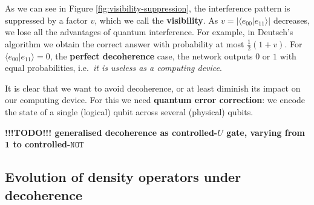 \documentclass[fleqn]{article}
\newenvironment{idea}{\noindent}{\medskip}
\begin{document}
As we can see in Figure \ref{fig:visibility-suppression}, the interference pattern is suppressed by a factor \(v\), which we call the \textbf{visibility}.
As \(v=|\langle e_{00}|e_{11}\rangle|\) decreases, we lose all the advantages of quantum interference.
For example, in Deutsch's algorithm we obtain the correct answer with probability at most \(\frac12(1+v)\).
For \(\langle e_{00}|e_{11}\rangle = 0\), the \textbf{perfect decoherence} case, the network outputs \(0\) or \(1\) with equal probabilities, i.e.~\emph{it is useless as a computing device}.

\begin{idea}

It is clear that we want to avoid decoherence, or at least diminish its impact on our computing device.
For this we need \textbf{quantum error correction}: we encode the state of a single (logical) qubit across several (physical) qubits.

\end{idea}

\textbf{!!!TODO!!! generalised decoherence as controlled-\(U\) gate, varying from \(\mathbf{1}\) to controlled-\(\texttt{NOT}\)}

\hypertarget{evolution-of-density-operators-under-decoherence}{%
\subsection{Evolution of density operators under decoherence}\label{evolution-of-density-operators-under-decoherence}}
\end{document}
